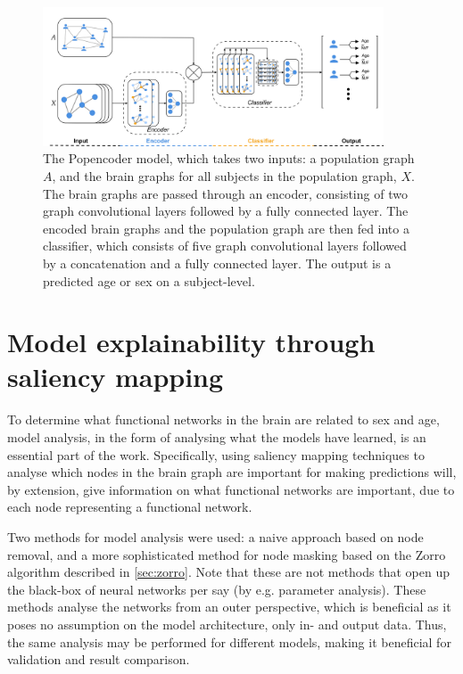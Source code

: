 \begin{figure}[!htbp]
    \centering
    \includegraphics[width=0.9\textwidth]{chapters/images_methods/popencoder_v2.png}
    \caption{The Popencoder model, which takes two inputs: a population graph $A$, and the brain graphs for all subjects in the population graph, $X$. The brain graphs are passed through an encoder, consisting of two graph convolutional layers followed by a fully connected layer. The encoded brain graphs and the population graph are then fed into a classifier, which consists of five graph convolutional layers followed by a concatenation and a fully connected layer. The output is a predicted age or sex on a subject-level.}
    \label{fig:popencoder}
\end{figure}

\section{Model explainability through saliency mapping}
To determine what functional networks in the brain are related to sex and age, model analysis, in the form of analysing what the models have learned, is an essential part of the work. Specifically, using saliency mapping techniques to analyse which nodes in the brain graph are important for making predictions will, by extension, give information on what functional networks are important, due to each node representing a functional network. 

Two methods for model analysis were used: a naive approach based on node removal, and a more sophisticated method for node masking based on the Zorro algorithm described in \cref{sec:zorro}. Note that these are not methods that open up the black-box of neural networks per say (by e.g. parameter analysis). These methods analyse the networks from an outer perspective, which is beneficial as it poses no assumption on the model architecture, only in- and output data. Thus, the same analysis may be performed for different models, making it beneficial for validation and result comparison. 

